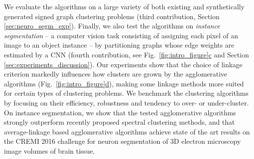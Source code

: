 We evaluate the algorithms on a large variety of both existing and synthetically generated signed graph clustering problems (third contribution, Section \ref{sec:neuro_segm_exp}). 
Finally, we also test the algorithms on \emph{instance segmentation} -- a computer vision task consisting of assigning each pixel of an image to an object instance -- by partitioning graphs whose edge weights are estimated by a CNN (fourth contribution, see Fig.~\hyperref[fig:intro_figure]{\ref*{fig:intro_figure}c} and Section \ref{sec:experiments_discussion}).
Our experiments show that the choice of linkage criterion markedly influences how clusters are grown by the agglomerative algorithms (Fig.~\hyperref[fig:intro_figure]{\ref*{fig:intro_figure}d}), making some linkage methods more suited for certain types of clustering problems.
We benchmark the clustering algorithms by focusing on their efficiency, robustness and tendency to over- or under-cluster. 
On instance segmentation, we show that the tested agglomerative algorithms strongly outperform recently proposed spectral clustering methods, and that average-linkage based agglomerative algorithms achieve state of the art results on the CREMI 2016 challenge for neuron segmentation of 3D electron microscopy image volumes of brain tissue. 









